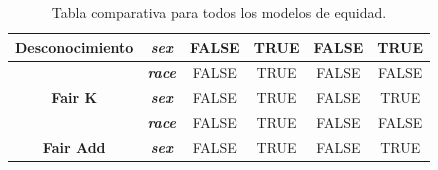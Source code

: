 \documentclass[oneside,openright,titlepage,numbers=noenddot,openany,headinclude,footinclude=true,
cleardoublepage=empty,abstractoff,BCOR=5mm,paper=a4,fontsize=12pt,main=spanish]{scrreprt}
\begin{document}
\begin{table}[h]
{\begin{tabular}{|c|c|c|cl|cl|cl|}
\multirow{-2}{*}{\textbf{Desconocimiento}} & \textit{\textbf{sex}}                                                  & {\color[HTML]{FE0000} FALSE}                                           & \multicolumn{2}{c|}{{\color[HTML]{32CB00} TRUE}}                                                 & \multicolumn{2}{c|}{{\color[HTML]{FE0000} FALSE}}                                                  & \multicolumn{2}{c|}{{\color[HTML]{32CB00} TRUE}}                                        \\ \hline
                                           & \textit{\textbf{race}}                                                 & {\color[HTML]{FE0000} FALSE}                                           & \multicolumn{2}{c|}{{\color[HTML]{32CB00} TRUE}}                                                 & \multicolumn{2}{c|}{{\color[HTML]{FE0000} FALSE}}                                                  & \multicolumn{2}{c|}{{\color[HTML]{FE0000} FALSE}}                                       \\ \cline{2-9} 
\multirow{-2}{*}{\textbf{Fair K}}          & \textit{\textbf{sex}}                                                  & {\color[HTML]{FE0000} FALSE}                                           & \multicolumn{2}{c|}{{\color[HTML]{32CB00} TRUE}}                                                 & \multicolumn{2}{c|}{{\color[HTML]{FE0000} FALSE}}                                                  & \multicolumn{2}{c|}{{\color[HTML]{32CB00} TRUE}}                                        \\ \hline
                                           & \textit{\textbf{race}}                                                 & {\color[HTML]{FE0000} FALSE}                                           & \multicolumn{2}{c|}{{\color[HTML]{32CB00} TRUE}}                                                 & \multicolumn{2}{c|}{{\color[HTML]{FE0000} FALSE}}                                                  & \multicolumn{2}{c|}{{\color[HTML]{FE0000} FALSE}}                                       \\ \cline{2-9} 
\multirow{-2}{*}{\textbf{Fair Add}}        & \textit{\textbf{sex}}                                                  & {\color[HTML]{FE0000} FALSE}                                           & \multicolumn{2}{c|}{{\color[HTML]{32CB00} TRUE}}                                                 & \multicolumn{2}{c|}{{\color[HTML]{FE0000} FALSE}}                                                  & \multicolumn{2}{c|}{{\color[HTML]{32CB00} TRUE}}                                        \\ \hline
\end{tabular}
}
\caption{Tabla comparativa para todos los modelos de equidad.}
\label{tab:equidadcomparativa}
\end{table}
\end{document}
